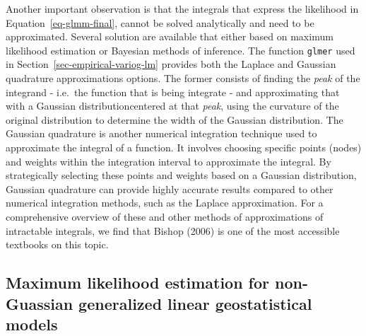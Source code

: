 \documentclass[
  letterpaper,
]{krantz}
\begin{document}
Another important observation is that the integrals that express the
likelihood in Equation~\ref{eq-glmm-final}, cannot be solved
analytically and need to be approximated. Several solution are available
that either based on maximum likelihood estimation or Bayesian methods
of inference. The function \texttt{glmer} used in
Section~\ref{sec-empirical-variog-lm} provides both the Laplace and
Gaussian quadrature approximations options. The former consists of
finding the \emph{peak} of the integrand - i.e.~the function that is
being integrate - and approximating that with a Gaussian
distributioncentered at that \emph{peak}, using the curvature of the
original distribution to determine the width of the Gaussian
distribution. The Gaussian quadrature is another numerical integration
technique used to approximate the integral of a function. It involves
choosing specific points (nodes) and weights within the integration
interval to approximate the integral. By strategically selecting these
points and weights based on a Gaussian distribution, Gaussian quadrature
can provide highly accurate results compared to other numerical
integration methods, such as the Laplace approximation. For a
comprehensive overview of these and other methods of approximations of
intractable integrals, we find that Bishop (2006) is one of the most
accessible textbooks on this topic.

\subsection{Maximum likelihood estimation for non-Guassian generalized
linear geostatistical models}\label{sec-glgm-lik}
\end{document}
